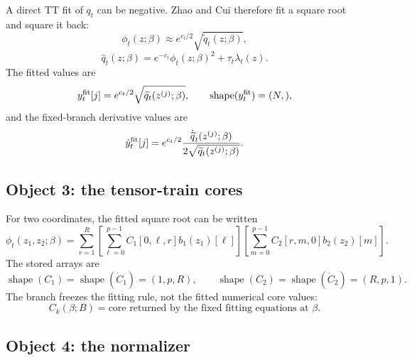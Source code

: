 \documentclass[11pt]{article}
\numberwithin{equation}{section}
\newcommand{\shape}{\operatorname{shape}}
\begin{document}
A direct TT fit of \(q_t\) can be negative.  Zhao and Cui \cite{zhao2024ttsequential} therefore fit a square
root and square it back:
\begin{equation}
    \phi_t(z;\beta)\approx e^{c_t/2}\sqrt{\widetilde q_t(z;\beta)},
    \label{eq:p24-p22-o6}
\end{equation}
\begin{equation}
    \widehat q_t(z;\beta)
    =
    e^{-c_t}\phi_t(z;\beta)^2+\tau_t\lambda_t(z).
    \label{eq:p24-p22-o7}
\end{equation}
The fitted values are
\begin{equation}
    y_t^{\rm fit}[j]
    =
    e^{c_t/2}\sqrt{\widetilde q_t(z^{(j)};\beta)},
    \qquad
    \shape(y_t^{\rm fit})=(N,),
    \label{eq:p24-p22-o8}
\end{equation}
and the fixed-branch derivative values are
\begin{equation}
    \dot y_t^{\rm fit}[j]
    =
    e^{c_t/2}
    \frac{\dot{\widetilde q}_t(z^{(j)};\beta)}
    {2\sqrt{\widetilde q_t(z^{(j)};\beta)}}.
    \label{eq:p24-p22-o9}
\end{equation}

\subsection*{Object 3: the tensor-train cores}

For two coordinates, the fitted square root can be written
\begin{equation}
    \phi_t(z_1,z_2;\beta)
    =
    \sum_{r=1}^{R}
    \left[
    \sum_{\ell=0}^{p-1}C_1[0,\ell,r]b_1(z_1)[\ell]
    \right]
    \left[
    \sum_{m=0}^{p-1}C_2[r,m,0]b_2(z_2)[m]
    \right].
    \label{eq:p24-p22-o10}
\end{equation}
The stored arrays are
\begin{equation}
    \shape(C_1)=\shape(\dot C_1)=(1,p,R),
    \qquad
    \shape(C_2)=\shape(\dot C_2)=(R,p,1).
    \label{eq:p24-p22-o11}
\end{equation}
The branch freezes the fitting rule, not the fitted numerical core values:
\begin{equation}
    C_k(\beta;B)
    =
    \text{core returned by the fixed fitting equations at }\beta.
    \label{eq:p24-p22-o12}
\end{equation}

\subsection*{Object 4: the normalizer}
\end{document}
